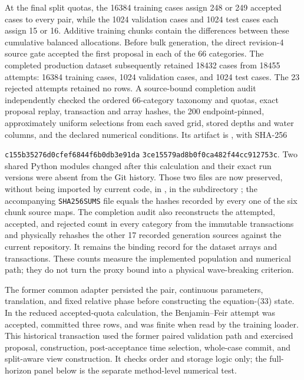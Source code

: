 At the final split quotas, the 16384 training cases assign 248 or 249 accepted
cases to every pair, while the 1024 validation cases and 1024 test cases each
assign 15 or 16.  Additive training chunks contain the differences between
these cumulative balanced allocations.  Before bulk generation, the direct
revision-4 source gate accepted the first proposal in each of the 66
categories.  The completed production dataset subsequently retained 18432
cases from 18455 attempts: 16384 training cases, 1024 validation cases, and
1024 test cases.  The 23 rejected attempts retained no rows.  A source-bound
completion audit independently checked the ordered 66-category taxonomy and
quotas, exact proposal replay, transaction and array hashes, the 200
endpoint-pinned, approximately uniform selections from each saved grid,
stored depths and water columns, and the declared numerical conditions.  Its
artifact is
,
with SHA-256
\par\noindent
\texttt{c155b35276d0cfef6844f6b0db3e91da}\allowbreak
\texttt{3ce15579ad8b0f0ca482f44cc912753c}.
Two shared Python modules changed after this calculation and their exact run
versions were absent from the Git history.  Those two files are now preserved,
without being imported by current code, in
, in the subdirectory
;
the accompanying \texttt{SHA256SUMS} file equals the hashes recorded by every
one of the six chunk source maps.  The completion audit also reconstructs the
attempted, accepted, and rejected count in every category from the immutable
transactions and physically rehashes the other 17 recorded generation sources
against the current repository.  It remains the binding record for the dataset
arrays and transactions.
These counts measure the implemented population and numerical path; they do
not turn the proxy bound into a physical wave-breaking criterion.

The former common adapter persisted the pair, continuous parameters,
translation, and fixed relative phase before constructing the equation-(33)
state.  In the
reduced accepted-quota
calculation, the Benjamin--Feir attempt was accepted, committed three rows,
and was finite when read by the training loader.  This historical transaction
used the former paired validation path and exercised proposal, construction,
post-acceptance time selection, whole-case commit, and split-aware view
construction.  It checks order and storage logic only; the full-horizon
panel below is the separate method-level numerical test.

